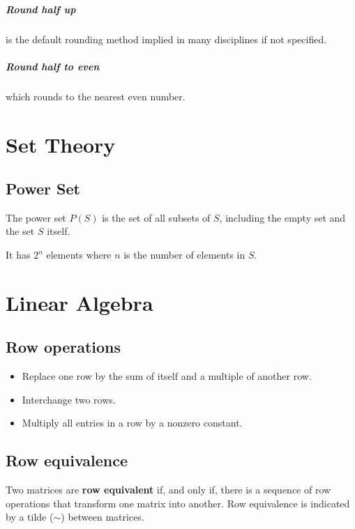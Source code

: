 \documentclass[oneside]{book} %
\theoremstyle{plain}
\begin{document}
\paragraph{Round half up} is the default rounding method implied in many
disciplines if not specified.
\paragraph{Round half to even} which rounds to the nearest even number.

\chapter{Set Theory}
\section{Power Set}
The power set \(P(S)\) is the set of all subsets of \(S\), including the empty
set and the set \(S\) itself.

It has \(2^n\) elements where \(n\) is the number of elements in \(S\).

\chapter{Linear Algebra}

\section{Row operations}
\begin{itemize}
\item{Replace one row by the sum of itself and a multiple of another row.}
\item{Interchange two rows.}
\item{Multiply all entries in a row by a nonzero constant.}
\end{itemize}

\section{Row equivalence}
Two matrices are \textbf{row equivalent} if, and only if, there is a sequence
of row operations that transform one matrix into another.
Row equivalence is indicated by a tilde (\(\sim\)) between matrices.
\end{document}
